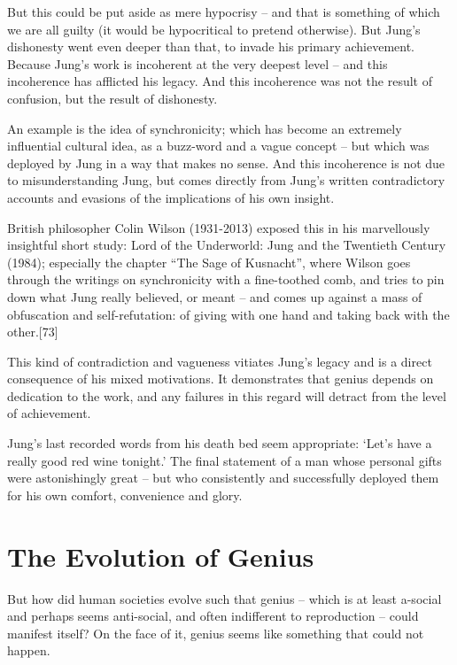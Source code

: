 \documentclass[
]{book}
\begin{document}
But this could be put aside as mere hypocrisy -- and that is something of which we are all guilty (it would be hypocritical to pretend otherwise). But Jung's dishonesty went even deeper than that, to invade his primary achievement. Because Jung's work is incoherent at the very deepest level -- and this incoherence has afflicted his legacy. And this incoherence was not the result of confusion, but the result of dishonesty.

An example is the idea of synchronicity; which has become an extremely influential cultural idea, as a buzz-word and a vague concept -- but which was deployed by Jung in a way that makes no sense. And this incoherence is not due to misunderstanding Jung, but comes directly from Jung's written contradictory accounts and evasions of the implications of his own insight.

British philosopher Colin Wilson (1931-2013) exposed this in his marvellously insightful short study: Lord of the Underworld: Jung and the Twentieth Century (1984); especially the chapter ``The Sage of Kusnacht'', where Wilson goes through the writings on synchronicity with a fine-toothed comb, and tries to pin down what Jung really believed, or meant -- and comes up against a mass of obfuscation and self-refutation: of giving with one hand and taking back with the other.{[}73{]}

This kind of contradiction and vagueness vitiates Jung's legacy and is a direct consequence of his mixed motivations. It demonstrates that genius depends on dedication to the work, and any failures in this regard will detract from the level of achievement.

Jung's last recorded words from his death bed seem appropriate: `Let's have a really good red wine tonight.' The final statement of a man whose personal gifts were astonishingly great -- but who consistently and successfully deployed them for his own comfort, convenience and glory.

\hypertarget{the-evolution-of-genius}{%
\chapter{The Evolution of Genius}\label{the-evolution-of-genius}}

But how did human societies evolve such that genius -- which is at least a-social and perhaps seems anti-social, and often indifferent to reproduction -- could manifest itself? On the face of it, genius seems like something that could not happen.
\end{document}

